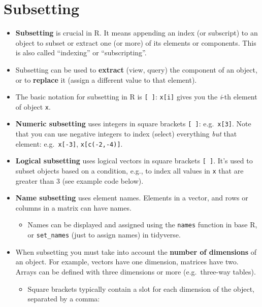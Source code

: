 \documentclass[
]{book}
\providecommand{\tightlist}{%
  \setlength{\itemsep}{0pt}\setlength{\parskip}{0pt}}
\begin{document}
\hypertarget{subsetting}{%
\section{Subsetting}\label{subsetting}}

\begin{itemize}
\tightlist
\item
  \textbf{Subsetting} is crucial in R. It means appending an index (or subscript) to an object to subset or extract one (or more) of its elements or components. This is also called ``indexing'' or ``subscripting''.
\item
  Subsetting can be used to \textbf{extract} (view, query) the component of an object, or to \textbf{replace} it (assign a different value to that element).
\item
  The basic notation for subsetting in R is \texttt{{[}\ {]}}: \texttt{x{[}i{]}} gives you the \emph{i}-th element of object \texttt{x}.
\item
  \textbf{Numeric subsetting} uses integers in square brackets \texttt{{[}\ {]}}: e.g.~\texttt{x{[}3{]}}. Note that you can use negative integers to index (select) everything \emph{but} that element: e.g.~\texttt{x{[}-3{]}}, \texttt{x{[}c(-2,-4){]}}.
\item
  \textbf{Logical subsetting} uses logical vectors in square brackets \texttt{{[}\ {]}}. It's used to subset objects based on a condition, e.g., to index all values in \texttt{x} that are greater than 3 (see example code below).
\item
  \textbf{Name subsetting} uses element names. Elements in a vector, and rows or columns in a matrix can have names.

  \begin{itemize}
  \tightlist
  \item
    Names can be displayed and assigned using the \texttt{names} function in base R, or \texttt{set\_names} (just to assign names) in tidyverse.
  \end{itemize}
\item
  When subsetting you must take into account the \textbf{number of dimensions} of an object. For example, vectors have one dimension, matrices have two. Arrays can be defined with three dimensions or more (e.g.~three-way tables).

  \begin{itemize}
  \tightlist
  \item
    Square brackets typically contain a slot for each dimension of the object, separated by a comma:


\end{itemize}
\end{itemize}
\end{document}
